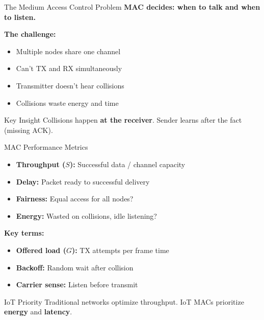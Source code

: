 \documentclass[aspectratio=169,11pt]{beamer}
\begin{document}
\begin{frame}{The Medium Access Control Problem}
    \textbf{MAC decides: when to talk and when to listen.}
    
    \vspace{0.3cm}
    \textbf{The challenge:}
    \begin{itemize}
        \item Multiple nodes share one channel
        \item Can't TX and RX simultaneously
        \item Transmitter doesn't hear collisions
        \item Collisions waste energy and time
    \end{itemize}
    
    \begin{alertblock}{Key Insight}
        Collisions happen \textbf{at the receiver}. Sender learns after the fact (missing ACK).
    \end{alertblock}
\end{frame}

\begin{frame}{MAC Performance Metrics}
    \begin{itemize}
        \item \textbf{Throughput ($S$):} Successful data / channel capacity
        \item \textbf{Delay:} Packet ready to successful delivery
        \item \textbf{Fairness:} Equal access for all nodes?
        \item \textbf{Energy:} Wasted on collisions, idle listening?
    \end{itemize}
    
    \textbf{Key terms:}
    \begin{itemize}
        \item \textbf{Offered load ($G$):} TX attempts per frame time
        \item \textbf{Backoff:} Random wait after collision
        \item \textbf{Carrier sense:} Listen before transmit
    \end{itemize}
    
    \begin{block}{IoT Priority}
        Traditional networks optimize throughput. IoT MACs prioritize \textbf{energy} and \textbf{latency}.
    \end{block}
\end{frame}
\end{document}
